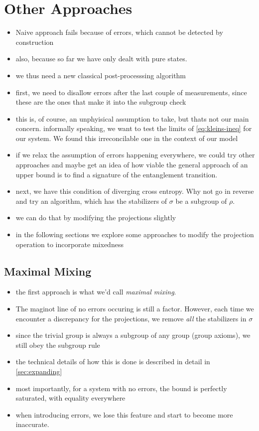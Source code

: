 \section{Other Approaches}
\begin{itemize}
  \item Naive approach fails because of errors, which cannot be detected by
    construction
  \item also, because so far we have only dealt with pure states.
  \item we thus need a new classical post-processsing algorithm
  \item first, we need to disallow errors after the last couple of
    measurements, since these are the ones that make it into the subgroup check
  \item this is, of course, an unphyisical assumption to take, but thats not
    our main concern. informally speaking, we want to test the limits of
    \cref{eq:kleins-ineq} for our system. We found this irreconcilable one in
    the context of our model
  \item if we relax the assumption of errors happening everywhere, we could try
    other approaches and maybe get an idea of how viable the general approach
    of an upper bound is to find a signature of the entanglement transition.
  \item next, we have this condition of diverging cross entropy. Why not go in
    reverse and try an algorithm, which has the stabilizers of $\sigma$ be a
    subgroup of $\rho$.
  \item we can do that by modifying the projections slightly
  \item in the following sections we explore some approaches to modify the
    projection operation to incorporate mixedness
\end{itemize}
\subsection{Maximal Mixing}
\begin{itemize}
  \item the first approach is what we'd call \emph{maximal mixing}.
  \item The maginot line of no errors occuring is still a factor. However, each
    time we encounter a discrepancy for the projections, we remove \emph{all}
    the stabilizers in $\sigma$
  \item since the trivial group is always a subgroup of any group (group
    axioms), we still obey the subgroup rule
  \item the technical details of how this is done is described in detail in
    \cref{sec:expanding}
  \item most importantly, for a system with no errors, the bound is perfectly
    saturated, with equality everywhere
  \item when introducing errors, we lose this feature and start to become more
    inaccurate.
\end{itemize}
